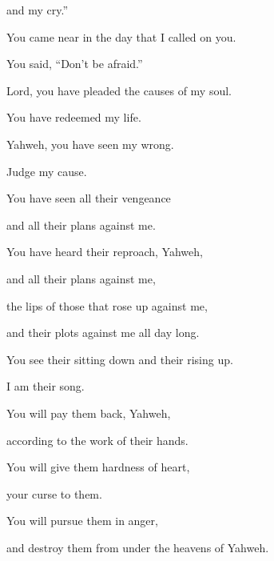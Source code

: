{\par }{\QB and my cry.”
\par }{\BB \par }{\Q {}You came near in the day that I called on you.
\par }{\QB You said, “Don’t be afraid.”
\par }{\BB \par }{\Q {}Lord, you have pleaded the causes of my soul.
\par }{\QB You have redeemed my life.
\par }{\Q {}Yahweh, you have seen my wrong.
\par }{\QB Judge my cause.
\par }{\Q {}You have seen all their vengeance
\par }{\QB and all their plans against me.
\par }{\BB \par }{\Q {}You have heard their reproach, Yahweh,
\par }{\QB and all their plans against me,
\par }{\Q {}the lips of those that rose up against me,
\par }{\QB and their plots against me all day long.
\par }{\Q {}You see their sitting down and their rising up.
\par }{\QB I am their song.
\par }{\BB \par }{\Q {}You will pay them back, Yahweh,
\par }{\QB according to the work of their hands.
\par }{\Q {}You will give them hardness of heart,
\par }{\QB your curse to them.
\par }{\Q {}You will pursue them in anger,
\par }{\QB and destroy them from under the heavens of Yahweh.

}

